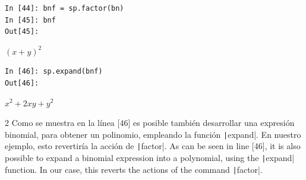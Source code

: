 \begin{center}
	\begin{minipage}{.25\textwidth}
\begin{verbatim}
In [44]: bnf = sp.factor(bn)
In [45]: bnf
Out[45]:
\end{verbatim}
$(x+y)^2$

\begin{verbatim}
In [46]: sp.expand(bnf)
Out[46]:
\end{verbatim}
$x^2+2xy+y^2$
\end{minipage}
\end{center}
\begin{paracol}{2}
Como se muestra en la línea [46] es posible también desarrollar una expresión binomial, para obtener un polinomio, empleando la función \texttt|expand|. En nuestro ejemplo, esto revertiría la acción de \texttt|factor|.
\switchcolumn
As can be seen in line [46], it is also possible to expand a binomial expression into a polynomial, using the \texttt|expand| function. In our case, this reverts the actions of the command \texttt|factor|.
\end{paracol}

